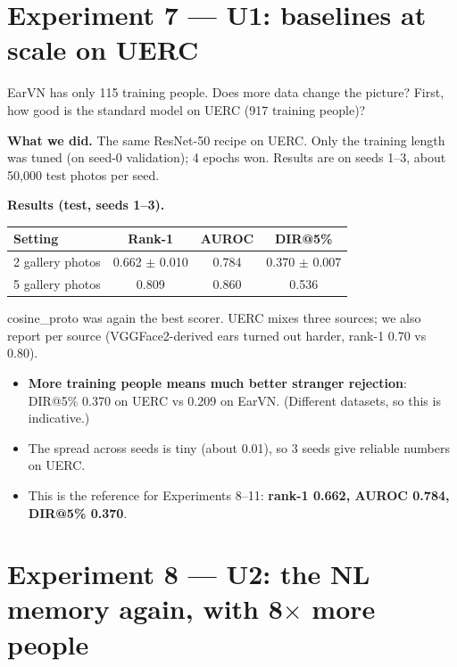 \documentclass[11pt,a4paper]{article}
\begin{document}
\section{Experiment 7 --- U1: baselines at scale on UERC}

\begin{question}
EarVN has only 115 training people. Does more data change the picture? First, how good is the standard model on UERC (917 training people)?
\end{question}

\textbf{What we did.} The same ResNet-50 recipe on UERC. Only the training length was tuned (on seed-0 validation); 4 epochs won. Results are on seeds 1--3, about 50{,}000 test photos per seed.

\textbf{Results (test, seeds 1--3).}
\begin{center}
\begin{tabular}{@{}lccc@{}}
\toprule
\textbf{Setting} & \textbf{Rank-1} & \textbf{AUROC} & \textbf{DIR@5\%}\\
\midrule
2 gallery photos & 0.662 $\pm$ 0.010 & 0.784 & 0.370 $\pm$ 0.007\\
5 gallery photos & 0.809 & 0.860 & 0.536\\
\bottomrule
\end{tabular}
\end{center}
cosine\_proto was again the best scorer. UERC mixes three sources; we also report per source (VGGFace2-derived ears turned out harder, rank-1 0.70 vs 0.80).

\begin{means}
\begin{itemize}[leftmargin=1.2em]
  \item \textbf{More training people means much better stranger rejection}: DIR@5\% 0.370 on UERC vs 0.209 on EarVN. (Different datasets, so this is indicative.)
  \item The spread across seeds is tiny (about 0.01), so 3 seeds give reliable numbers on UERC.
  \item This is the reference for Experiments 8--11: \textbf{rank-1 0.662, AUROC 0.784, DIR@5\% 0.370}.
\end{itemize}
\end{means}

\section{Experiment 8 --- U2: the NL memory again, with 8$\times$ more people}
\end{document}
